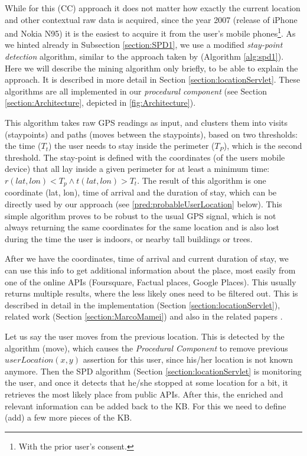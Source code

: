 While for this (CC) approach it does not matter how exactly the current location
and other contextual raw data is acquired, since the year 2007 (release of 
iPhone and Nokia N95) it is the easiest to acquire it from the user's mobile 
phones\footnote{With the prior user's consent.}. As we hinted already in Subsection \ref{section:SPD1}, we use a modified \emph{stay-point detection} algorithm, similar to the approach taken by \textcite{Kang2005} (Algorithm \ref{alg:spd1}). 
Here we will describe the mining 
algorithm only briefly, to be able to explain the approach. It is described in
more detail in Section \ref{section:locationServlet}. These algorithms are all
implemented in our \emph{procedural component} 
(see Section \ref{section:Architecture}, depicted in \autoref{fig:Architecture}).

This algorithm takes raw GPS readings as input, and clusters them into visits
(staypoints) and paths (moves between the staypoints), based on two thresholds:
the time ($T_t$) the user needs to stay
inside the perimeter ($T_P$), which is the second threshold. The stay-point is 
defined with the coordinates (of the users mobile device) that all lay inside a
given perimeter for at least a minimum time: 
$r(lat,lon)<T_p \land t(lat,lon)>T_t$. The result of this algorithm is one
coordinate (lat, lon), time of arrival and the duration of stay, which can be
directly used by our approach (see \autoref{pred:probableUserLocation} below). 
This simple algorithm proves 
to be robust to the usual GPS signal, which is not always returning the same 
coordinates for the same location and is also lost during the time the user is
indoors, or nearby tall buildings or trees. 

After we have the coordinates, time of arrival and current duration of stay,
we can use this info to get additional information about the place, most easily
from one of the online APIs (Foursquare, Factual places, Google Places). This usually returns multiple results, where the less likely ones need to be filtered
out. This is described in detail in the implementation 
(Section \ref{section:locationServlet}), 
related work (Section \ref{section:MarcoMamei}) and also in the related papers 
\autocite{Mamei2010,Bradesko2015}.

Let us say the user moves from the previous location. This is detected by the
algorithm (move), which causes the \emph{Procedural Component} to remove 
previous $userLocation(x,y)$ assertion for this user, since his/her location is
not known anymore. Then the SPD algorithm (Section 
\ref{section:locationServlet} is monitoring the user, and 
once it detects that he/she stopped at some location for a bit, it retrieves 
the most likely place from public APIs. After this, the enriched and relevant 
information can be added 
back to the KB. For this we need to define (add) a few more pieces of the KB.

